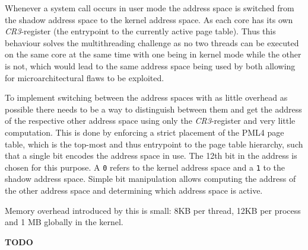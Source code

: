 Whenever a system call occurs in user mode the address space is switched from the shadow address space to the kernel address space.
As each core has its own \textit{CR3}-register (the entrypoint to the currently active page table).
Thus this behaviour solves the multithreading challenge as no two threads can be executed on the same core at the same time with one being in kernel mode while the other is not, which would lead to the same address space being used by both allowing for microarchitectural flaws to be exploited.

To implement switching between the address spaces with as little overhead as possible there needs to be a way to distinguish between them and get the address of the respective other address space using only the \textit{CR3}-register and very little computation.
This is done by enforcing a strict placement of the PML4 page table, which is the top-most and thus entrypoint to the page table hierarchy, such that a single bit encodes the address space in use.
The 12th bit in the address is chosen for this purpose.
A \lstinline{0} refers to the kernel address space and a \lstinline{1} to the shadow address space.
Simple bit manipulation allows computing the address of the other address space and determining which address space is active.

Memory overhead introduced by this is small: 8KB per thread, 12KB per process and 1 MB globally in the kernel.

\textbf{TODO}
